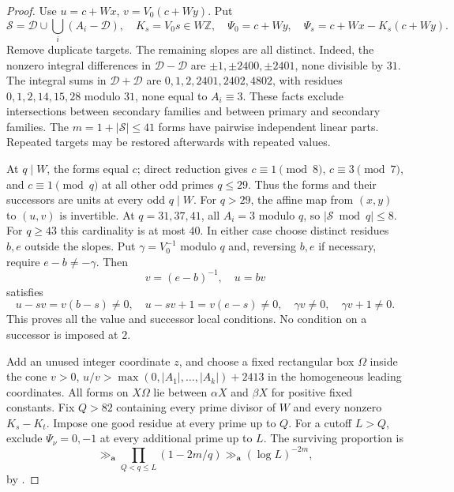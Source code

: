 \begin{proof}
Use $u=c+Wx$, $v=V_0(c+Wy)$. Put
\[
 \mathcal S=\mathcal D\cup\bigcup_i(A_i-\mathcal D),\quad
 K_s=V_0s\in W\mathbb Z,
 \quad\Psi_0=c+Wy,\quad\Psi_s=c+Wx-K_s(c+Wy).
\]
Remove duplicate targets. The remaining slopes are all distinct.
Indeed, the nonzero integral differences in $\mathcal D-\mathcal D$
are $\pm1,\pm2400,\pm2401$, none divisible by $31$.
The integral sums in $\mathcal D+\mathcal D$ are
$0,1,2,2401,2402,4802$, with residues $0,1,2,14,15,28$ modulo $31$,
none equal to $A_i\equiv3$. These facts exclude intersections between
secondary families and between primary and secondary families.
The $m=1+|\mathcal S|\le41$ forms have pairwise independent linear
parts. Repeated targets may be restored afterwards with repeated values.

At $q\mid W$, the forms equal $c$; direct reduction gives
$c\equiv1\pmod8$, $c\equiv3\pmod7$, and $c\equiv1\pmod q$ at
all other odd primes $q\le29$. Thus the forms and their successors
are units at every odd $q\mid W$. For $q>29$, the affine map from
$(x,y)$ to $(u,v)$ is invertible. At $q=31,37,41$, all $A_i=3$
modulo $q$, so $|\mathcal S\bmod q|\le8$. For $q\ge43$ this
cardinality is at most $40$. In either case choose distinct residues
$b,e$ outside the slopes. Put $\gamma=V_0^{-1}$ modulo $q$ and,
reversing $b,e$ if necessary, require $e-b\ne-\gamma$. Then
\[
 v=(e-b)^{-1},\quad u=bv
\]
satisfies
\[
 u-sv=v(b-s)\ne0,\quad u-sv+1=v(e-s)\ne0,
 \quad\gamma v\ne0,\quad\gamma v+1\ne0.
\]
This proves all the value and successor local conditions. No condition
on a successor is imposed at $2$.

Add an unused integer coordinate $z$, and choose a fixed rectangular
box $\Omega$ inside the cone $v>0$, $u/v>\max(0,|A_1|,\ldots,|A_k|)+2413$ in the
homogeneous leading coordinates. All forms on $X\Omega$ lie between
$\alpha X$ and $\beta X$ for positive fixed constants. Fix $Q>82$
containing every prime divisor of $W$ and every nonzero $K_s-K_t$.
Impose one good residue at every prime up to $Q$. For a cutoff $L>Q$,
exclude $\Psi_\nu=0,-1$ at every additional prime up to $L$.
The surviving proportion is
\[
 \gg_{\mathbf a}\prod_{Q<q\le L}(1-2m/q)
 \gg_{\mathbf a}(\log L)^{-2m},
\]
by \cite[Theorem~1, modulus~2]{williams-mertens}.


\end{proof}
